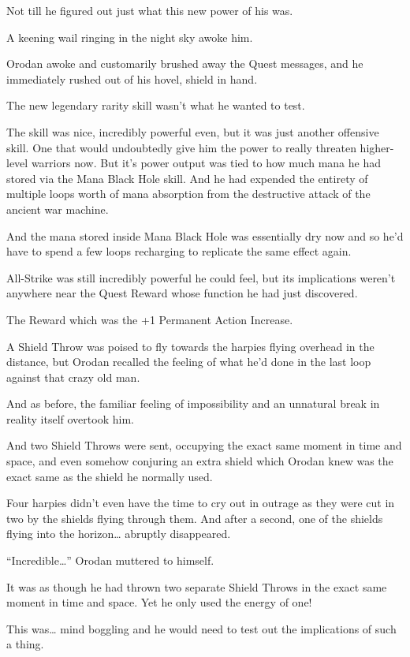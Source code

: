 \documentclass[a4paper,10pt]{book}
\begin{document}
Not till he figured out just what this new power of his was.\par
\par
A keening wail ringing in the night sky awoke him.\par
Orodan awoke and customarily brushed away the Quest messages, and he immediately rushed out of his hovel, shield in hand.\par
The new legendary rarity skill wasn’t what he wanted to test.\par
The skill was nice, incredibly powerful even, but it was just another offensive skill. One that would undoubtedly give him the power to really threaten higher-level warriors now. But it’s power output was tied to how much mana he had stored via the Mana Black Hole skill. And he had expended the entirety of multiple loops worth of mana absorption from the destructive attack of the ancient war machine.\par
And the mana stored inside Mana Black Hole was essentially dry now and so he’d have to spend a few loops recharging to replicate the same effect again.\par
All-Strike was still incredibly powerful he could feel, but its implications weren’t anywhere near the Quest Reward whose function he had just discovered.\par
The Reward which was the +1 Permanent Action Increase.\par
A Shield Throw was poised to fly towards the harpies flying overhead in the distance, but Orodan recalled the feeling of what he’d done in the last loop against that crazy old man.\par
And as before, the familiar feeling of impossibility and an unnatural break in reality itself overtook him.\par
And two Shield Throws were sent, occupying the exact same moment in time and space, and even somehow conjuring an extra shield which Orodan knew was the exact same as the shield he normally used.\par
Four harpies didn’t even have the time to cry out in outrage as they were cut in two by the shields flying through them. And after a second, one of the shields flying into the horizon… abruptly disappeared.\par
“Incredible…” Orodan muttered to himself.\par
It was as though he had thrown two separate Shield Throws in the exact same moment in time and space. Yet he only used the energy of one!\par
This was… mind boggling and he would need to test out the implications of such a thing.\par
\end{document}

